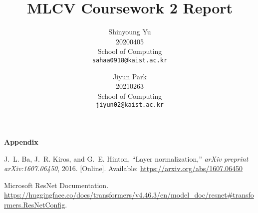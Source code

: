 \documentclass[10pt,twocolumn,letterpaper]{article}
\begin{document}
\pagestyle{plain}

\title{MLCV Coursework 2 Report}

\author{Shinyoung Yu\\
20200405\\
School of Computing\\
{\tt\small sahaa0918@kaist.ac.kr}
\and
Jiyun Park\\
20210263\\
School of Computing\\
{\tt\small jiyun02@kaist.ac.kr}
}

\maketitle

%    





\onecolumn
\newpage
{\LARGE 
	\textbf{Appendix}\par}
\appendix


\begin{thebibliography}{9}
J.~L. Ba, J.~R. Kiros, and G.~E. Hinton, ``Layer normalization,'' \emph{arXiv preprint arXiv:1607.06450}, 2016. [Online]. Available: \url{https://arxiv.org/abs/1607.06450}
	
	Microsoft ResNet Documentation.
	\url{https://huggingface.co/docs/transformers/v4.46.3/en/model_doc/resnet#transformers.ResNetConfig}.
\end{thebibliography}

% 
\end{document}
